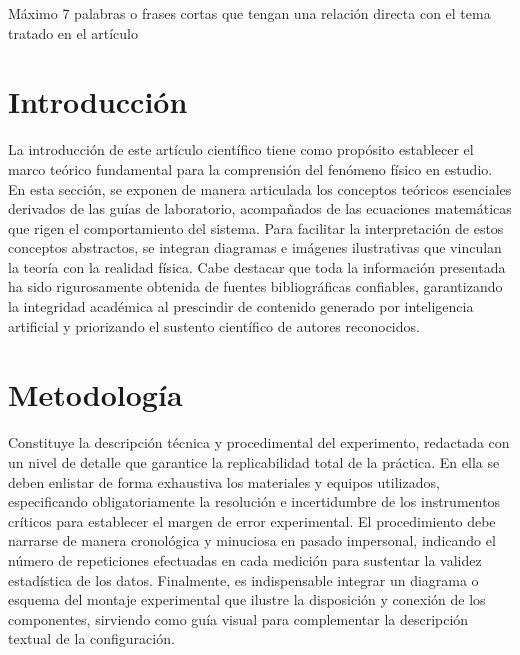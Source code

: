 \documentclass[conference]{IEEEtran}
\begin{document}
\begin{IEEEkeywords}
Máximo 7 palabras o frases cortas que tengan una relación directa con el tema tratado en el artículo
\end{IEEEkeywords}

\section{Introducción}
La introducción de este artículo científico tiene como propósito establecer el marco teórico fundamental para la comprensión del fenómeno físico en estudio. En esta sección, se exponen de manera articulada los conceptos teóricos esenciales derivados de las guías de laboratorio, acompañados de las ecuaciones matemáticas que rigen el comportamiento del sistema. Para facilitar la interpretación de estos conceptos abstractos, se integran diagramas e imágenes ilustrativas que vinculan la teoría con la realidad física. Cabe destacar que toda la información presentada ha sido rigurosamente obtenida de fuentes bibliográficas confiables, garantizando la integridad académica al prescindir de contenido generado por inteligencia artificial y priorizando el sustento científico de autores reconocidos.

\section{Metodología}

Constituye la descripción técnica y procedimental del experimento, redactada con un nivel de detalle que garantice la replicabilidad total de la práctica. En ella se deben enlistar de forma exhaustiva los materiales y equipos utilizados, especificando obligatoriamente la resolución e incertidumbre de los instrumentos críticos para establecer el margen de error experimental. El procedimiento debe narrarse de manera cronológica y minuciosa en pasado impersonal, indicando el número de repeticiones efectuadas en cada medición para sustentar la validez estadística de los datos. Finalmente, es indispensable integrar un diagrama o esquema del montaje experimental que ilustre la disposición y conexión de los componentes, sirviendo como guía visual para complementar la descripción textual de la configuración.
\end{document}
